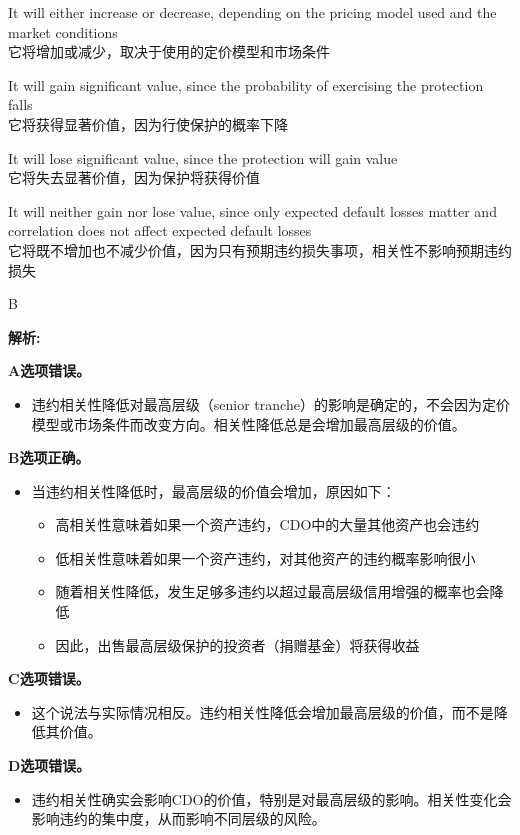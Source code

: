 \documentclass{article}
\newenvironment{explanation}
{\textbf{解析:}\par}
{\par}
\begin{document}
\begin{choices}
    \item It will either increase or decrease, depending on the pricing model used and the market conditions\\
    它将增加或减少，取决于使用的定价模型和市场条件
    \item It will gain significant value, since the probability of exercising the protection falls\\
    它将获得显著价值，因为行使保护的概率下降
    \item It will lose significant value, since the protection will gain value\\
    它将失去显著价值，因为保护将获得价值
    \item It will neither gain nor lose value, since only expected default losses matter and correlation does not affect expected default losses\\
    它将既不增加也不减少价值，因为只有预期违约损失事项，相关性不影响预期违约损失
\end{choices}

\begin{correctanswer}
    B
\end{correctanswer}

\begin{explanation}
    \textbf{A选项错误。}
    \begin{itemize}
    \item 违约相关性降低对最高层级（senior tranche）的影响是确定的，不会因为定价模型或市场条件而改变方向。相关性降低总是会增加最高层级的价值。
    \end{itemize}

    \textbf{B选项正确。}
    \begin{itemize}
    \item 当违约相关性降低时，最高层级的价值会增加，原因如下：
    \begin{itemize}
        \item 高相关性意味着如果一个资产违约，CDO中的大量其他资产也会违约
        \item 低相关性意味着如果一个资产违约，对其他资产的违约概率影响很小
        \item 随着相关性降低，发生足够多违约以超过最高层级信用增强的概率也会降低
        \item 因此，出售最高层级保护的投资者（捐赠基金）将获得收益
    \end{itemize}
    \end{itemize}
    \textbf{C选项错误。}
    \begin{itemize}
    \item 这个说法与实际情况相反。违约相关性降低会增加最高层级的价值，而不是降低其价值。
    \end{itemize}

    \textbf{D选项错误。}
    \begin{itemize}
    \item 违约相关性确实会影响CDO的价值，特别是对最高层级的影响。相关性变化会影响违约的集中度，从而影响不同层级的风险。
    \end{itemize}
\end{explanation}
\end{document}
